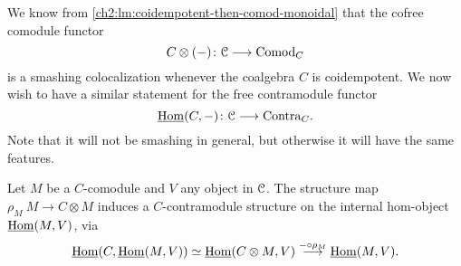 We know from \cref{ch2:lm:coidempotent-then-comod-monoidal} that the cofree comodule functor 
\[C\otimes(-)\colon \EuScript{C}\longrightarrow \mathrm{Comod}_C\]
is a smashing colocalization whenever the coalgebra $C$ is coidempotent. We now wish to have a similar statement for the free contramodule functor 
\[\operatorname{\underline{Hom}}(C,-)\colon \EuScript{C}\longrightarrow \mathrm{Contra}_C.\]
Note that it will not be smashing in general, but otherwise it will have the same features. 

\begin{remark}
    \label{ch2:rm:contramodule-structure-on-hom-from-comodule}
    Let $M$ be a $C$-comodule and $V$ any object in $\EuScript{C}$. The structure map $\rho_M\: M\to C\otimes M$ induces a $C$-contramodule structure on the internal hom-object $\operatorname{\underline{Hom}}(M, V)$, via 
    \[\operatorname{\underline{Hom}}(C, \operatorname{\underline{Hom}}(M, V))\simeq \operatorname{\underline{Hom}}(C\otimes M, V)\overset{-\circ \rho_M}{\longrightarrow} \operatorname{\underline{Hom}}(M, V).\]
\end{remark}

